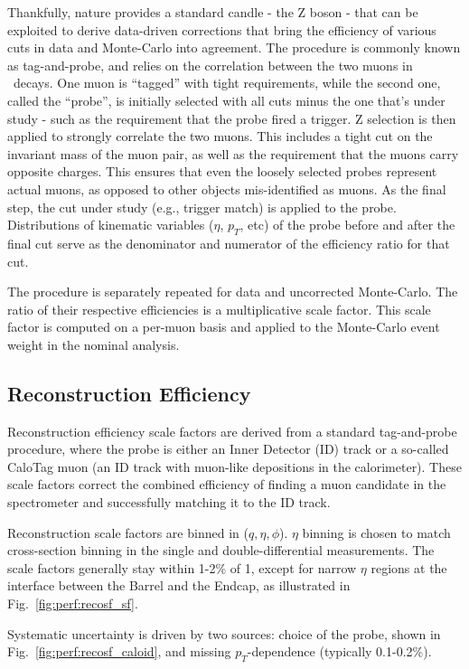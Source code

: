 Thankfully, nature provides a standard candle - the Z boson - that can be exploited to derive data-driven corrections that bring the efficiency of various cuts in data and Monte-Carlo into agreement. The procedure is commonly known as tag-and-probe, and relies on the correlation between the two muons in \Zmm\ decays. One muon is ``tagged'' with tight requirements, while the second one, called the ``probe'', is initially selected with all cuts minus the one that's under study - such as the requirement that the probe fired a trigger. Z selection is then applied to strongly correlate the two muons. This includes a tight cut on the invariant mass of the muon pair, as well as the requirement that the muons carry opposite charges. This ensures that even the loosely selected probes represent actual muons, as opposed to other objects mis-identified as muons. As the final step, the cut under study (e.g., trigger match) is applied to the probe. Distributions of kinematic variables ($\eta$, $p_T$, etc) of the probe before and after the final cut serve as the denominator and numerator of the efficiency ratio for that cut.

The procedure is separately repeated for data and uncorrected Monte-Carlo. The ratio of their respective efficiencies is a multiplicative scale factor. This scale factor is computed on a per-muon basis and applied to the Monte-Carlo event weight in the nominal analysis.

\subsection{Reconstruction Efficiency}
Reconstruction efficiency scale factors are derived from a standard tag-and-probe procedure, where the probe is either an Inner Detector (ID) track or a so-called CaloTag muon (an ID track with muon-like depositions in the calorimeter). These scale factors correct the combined efficiency of finding a muon candidate in the spectrometer and successfully matching it to the ID track.

Reconstruction scale factors are binned in ($q,\eta,\phi$). $\eta$ binning is chosen to match cross-section binning in the single and double-differential measurements. The scale factors generally stay within 1-2\% of 1, except for narrow $\eta$ regions at the interface between the Barrel and the Endcap, as illustrated in Fig.~\ref{fig:perf:recosf_sf}.

Systematic uncertainty is driven by two sources: choice of the probe, shown in Fig.~\ref{fig:perf:recosf_caloid}, and missing $p_T$-dependence (typically 0.1-0.2\%).

